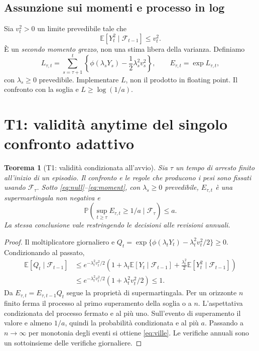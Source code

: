 \documentclass[11pt,a4paper]{article}
\newtheorem{theorem}{Teorema}[section]
\theoremstyle{definition}\newtheorem{definition}[theorem]{Definizione}
\theoremstyle{remark}\newtheorem{remark}[theorem]{Osservazione}
\newcommand{\E}{\mathbb E}\newcommand{\PP}{\mathbb P}\newcommand{\R}{\mathbb R}
\newcommand{\F}{\mathcal F}\newcommand{\W}{\mathcal W}\newcommand{\supp}{\operatorname{supp}}
\begin{document}
\subsection{Assunzione sui momenti e processo in log}
Sia $v_t^2>0$ un limite prevedibile tale che
\begin{equation}
 \E[Y_t^2\mid\F_{t-1}]\le v_t^2.\label{eq:moment}
\end{equation}
È un \emph{secondo momento grezzo}, non una stima libera della varianza. Definiamo
\begin{equation}
 L_{\tau,t}=\sum_{s=\tau+1}^t\left\{\phi(\lambda_sY_s)-\frac12\lambda_s^2v_s^2\right\},
 \qquad E_{\tau,t}=\exp L_{\tau,t},\label{eq:catoni}
\end{equation}
con $\lambda_s\ge0$ prevedibile. Implementare $L$, non il prodotto in floating point. Il confronto con la soglia e $L\ge\log(1/a)$.

\section{T1: validità anytime del singolo confronto adattivo}
\label{sec:T1}
\begin{theorem}[T1: validità condizionata all'avvio]
Sia $\tau$ un tempo di arresto finito all'inizio di un episodio. Il confronto e le regole che producono i pesi sono fissati usando $\F_\tau$. Sotto \eqref{eq:null}--\eqref{eq:moment}, con $\lambda_s\ge0$ prevedibile, $E_{\tau,t}$ è una supermartingala non negativa e
\begin{equation}
 \PP\left(\sup_{t\ge\tau}E_{\tau,t}\ge1/a\mid\F_\tau\right)\le a.\label{eq:ville}
\end{equation}
La stessa conclusione vale restringendo le decisioni alle revisioni annuali.
\end{theorem}
\begin{proof}
Il moltiplicatore giornaliero e $Q_t=\exp\{\phi(\lambda_tY_t)-\lambda_t^2v_t^2/2\}\ge0$. Condizionando al passato,
\begin{align*}
 \E[Q_t\mid\F_{t-1}]
 &\le e^{-\lambda_t^2v_t^2/2}\left(1+\lambda_t\E[Y_t\mid\F_{t-1}]
      +\frac{\lambda_t^2}{2}\E[Y_t^2\mid\F_{t-1}]\right)\\
 &\le e^{-\lambda_t^2v_t^2/2}(1+\lambda_t^2v_t^2/2)\le1.
\end{align*}
Da $E_{\tau,t}=E_{\tau,t-1}Q_t$ segue la proprietà di supermartingala. Per un orizzonte $n$ finito ferma il processo al primo superamento della soglia o a $n$. L'aspettativa condizionata del processo fermato e al più uno. Sull'evento di superamento il valore e almeno $1/a$, quindi la probabilità condizionata e al più $a$. Passando a $n\to\infty$ per monotonia degli eventi si ottiene \eqref{eq:ville}. Le verifiche annuali sono un sottoinsieme delle verifiche giornaliere.
\end{proof}
\end{document}
